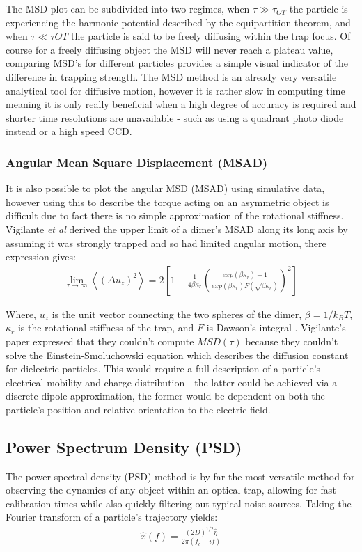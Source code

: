 The MSD plot can be subdivided into two regimes, when $\tau \gg \tau_{OT}$ 
the particle is experiencing the harmonic potential described by 
the equipartition theorem, and when $\tau \ll \tau{OT}$ the particle 
is said to be freely diffusing within the trap focus. Of course for 
a freely diffusing object the MSD will never reach a plateau value, 
comparing MSD's for different particles provides a simple visual 
indicator of the difference in trapping strength. The MSD method is 
an already very versatile analytical tool for diffusive motion, however 
it is rather slow in computing time meaning it is only really beneficial 
when a high degree of accuracy is required and shorter time resolutions 
are unavailable - such as using a quadrant photo diode instead or a high 
speed CCD.

\subsubsection{Angular Mean Square Displacement (MSAD)}
It is also possible to plot the angular MSD (MSAD) using simulative data, 
however using this to describe the torque acting on an asymmetric object 
is difficult due to fact there is no simple approximation of the rotational
stiffness. Vigilante \textit{et al} \cite{Vigilante2020} derived the upper 
limit of a dimer's MSAD along its long axis by assuming it was strongly 
trapped and so had limited angular motion, there expression gives:
\begin{align}
	\lim_{\tau\to\infty}\left<(\Delta u_z)^2\right> = 
	2\left[1-\frac{1}{4\beta\kappa_r} 
	\left(\frac{exp(\beta\kappa_r)-1}
	{exp(\beta\kappa_r)F(\sqrt{\beta\kappa_r})
	}\right)^2\right]
\end{align}  

Where, $u_z$ is the unit vector connecting the two spheres of the dimer, 
$\beta=1/k_BT$, $\kappa_r$ is the rotational stiffness of the trap, and $F$ 
is Dawson's integral \cite{Oldham2008}. Vigilante's paper expressed that 
they couldn't compute $MSD(\tau)$ because they couldn't solve the 
Einstein-Smoluchowski equation which describes the diffusion constant for 
dielectric particles. This would require a full description of a 
particle's electrical mobility and charge distribution - the latter could 
be achieved via a discrete dipole approximation, the former would be 
dependent on both the particle's position and relative orientation to the 
electric field.

\subsection{Power Spectrum Density (PSD)}
The power spectral density (PSD) method is by far the most versatile 
method for observing the dynamics of any object within an optical trap, 
allowing for fast calibration times while also quickly filtering out 
typical noise sources. Taking the Fourier transform of a particle's 
trajectory yields:
\begin{align}
	\hat{x}(f) = \frac{(2D)^{1/2}\hat{\eta}}{2\pi(f_c-if)}
\end{align}

